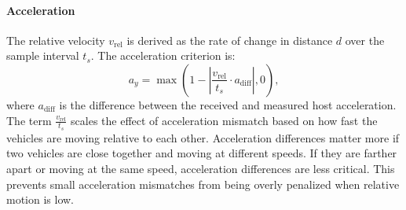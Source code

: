 \documentclass[letterpaper, 10pt, conference]{ieeeconf}  %
\begin{document}
\paragraph{Acceleration} The relative velocity $v_\text{rel}$ is derived as the rate of change in distance $d$ over the sample interval $t_s$. The acceleration criterion is:
\begin{equation}
    a_y = \max\left(1 - \left|\frac{v_\text{rel}}{t_s} \cdot a_\text{diff}\right|, 0\right),
\end{equation}
where $a_\text{diff}$ is the difference between the received and measured host acceleration. The term $\frac{v_\text{rel}}{t_s}$ scales the effect of acceleration mismatch based on how fast the vehicles are moving relative to each other.
Acceleration differences matter more if two vehicles are close together and moving at different speeds.
If they are farther apart or moving at the same speed, acceleration differences are less critical.
This prevents small acceleration mismatches from being overly penalized when relative motion is low.


\end{document}
